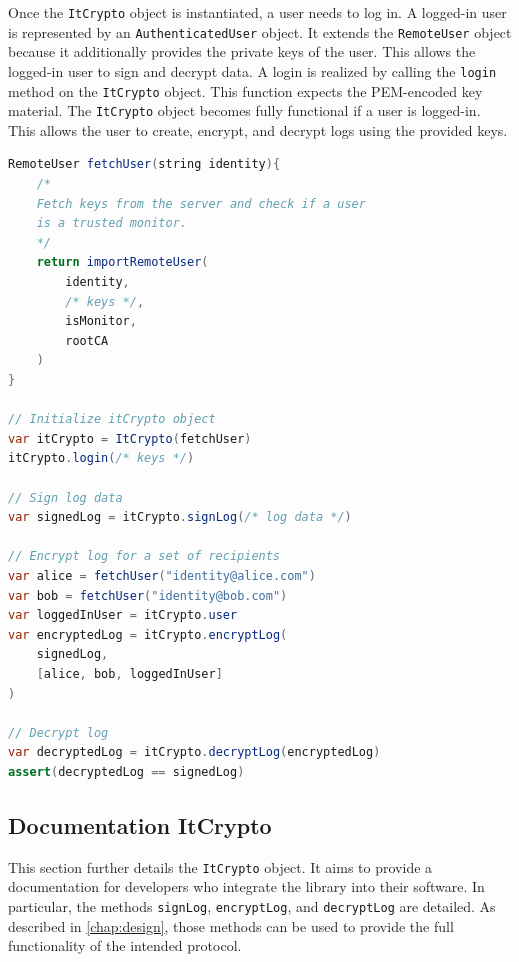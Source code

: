 \documentclass[../main.tex]{subfiles}
\begin{document}
Once the \verb|ItCrypto| object is instantiated, a user needs to log in.
A logged-in user is represented by an \verb|AuthenticatedUser| object.
It extends the \verb|RemoteUser| object because it additionally provides the private keys of the user.
This allows the logged-in user to sign and decrypt data.
A login is realized by calling the \verb|login| method on the \verb|ItCrypto| object.
This function expects the PEM-encoded key material.
The \verb|ItCrypto| object becomes fully functional if a user is logged-in.
This allows the user to create, encrypt, and decrypt logs using the provided keys.

\begin{lstlisting}[basicstyle=\small, label=lst:pseudocode,float,floatplacement=tbp, language=Java, caption={[Library usage]Pseudocode of creating, encrypting, and decrypting logs using the provided libraries.}, morekeywords={RemoteUser, var, assert}, commentstyle=\color{codegreen}]
RemoteUser fetchUser(string identity){
    /*
    Fetch keys from the server and check if a user 
    is a trusted monitor.
    */
    return importRemoteUser(
        identity,
        /* keys */, 
        isMonitor, 
        rootCA
    )
}

// Initialize itCrypto object
var itCrypto = ItCrypto(fetchUser)
itCrypto.login(/* keys */)

// Sign log data
var signedLog = itCrypto.signLog(/* log data */)

// Encrypt log for a set of recipients
var alice = fetchUser("identity@alice.com")
var bob = fetchUser("identity@bob.com")
var loggedInUser = itCrypto.user
var encryptedLog = itCrypto.encryptLog(
    signedLog, 
    [alice, bob, loggedInUser]
)

// Decrypt log
var decryptedLog = itCrypto.decryptLog(encryptedLog)
assert(decryptedLog == signedLog)
\end{lstlisting}

\subsection{Documentation ItCrypto}
This section further details the \verb|ItCrypto| object.
It aims to provide a documentation for developers who integrate the library into their software.
In particular, the methods \verb|signLog|, \verb|encryptLog|, and \verb|decryptLog| are detailed.
As described in \cref{chap:design}, those methods can be used to provide the full functionality of the intended protocol.
\end{document}

